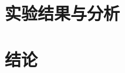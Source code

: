 \documentclass[12pt, UTF8, AutoFakeBold]{ctexart}  %
\begin{document}
  \section{\hei\xiaoer\textbf{实验结果与分析}}
  
  \newpage
  \section*{\hei\xiaoer\textbf{结论}}
  
  \newpage

  
  

  

\end{document}
